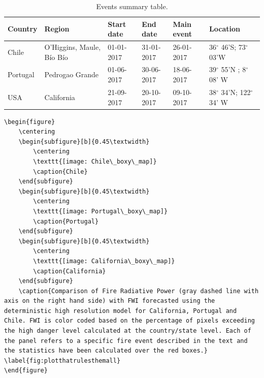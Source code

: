 \documentclass[, manuscript]{copernicus}
\begin{document}
\begin{table}
\caption{Events summary table.}
\label{tab:fires}
\begin{center}
\begin{tabular}{|llllll|}
\hline
Country  & Region          & Start date & End date &Main event & Location  \\\hline
Chile    & O'Higgins, Maule, B\'io B\'io  & 01-01-2017 & 31-01-2017& 26-01-2017& 36$^\circ$ 46'S; 73$^\circ$ 03'W \\
Portugal & Pedrogao Grande & 01-06-2017 & 30-06-2017 &18-06-2017 & 39$^\circ$ 55'N ; 8$^\circ$ 08' W\\
USA      & California      & 21-09-2017 & 20-10-2017 &09-10-2017& 38$^\circ$ 34'N; 122$^\circ$ 34' W\\
\hline
\end{tabular}
\end{center}
\end{table}

\begin{verbatim}
\begin{figure}
    \centering
    \begin{subfigure}[b]{0.45\textwidth}
        \centering
        \texttt{[image: Chile\_boxy\_map]}
        \caption{Chile}
    \end{subfigure}
    \begin{subfigure}[b]{0.45\textwidth}
        \centering
        \texttt{[image: Portugal\_boxy\_map]}
        \caption{Portugal}
    \end{subfigure}
    \begin{subfigure}[b]{0.45\textwidth}
        \centering
        \texttt{[image: California\_boxy\_map]}
        \caption{California}
    \end{subfigure}
    \caption{Comparison of Fire Radiative Power (gray dashed line with axis on the right hand side) with FWI forecasted using the deterministic high resolution model for California, Portugal and  Chile. FWI is color coded based on the percentage of pixels exceeding the high danger level calculated at the country/state level. Each of the panel refers to a specific fire event described in the text and the statistics have been calculated over the red boxes.} \label{fig:plotthatrulesthemall}
\end{figure}
\end{verbatim}
\end{document}
